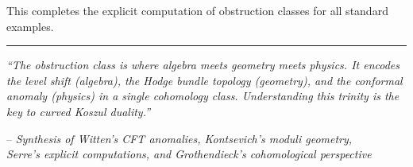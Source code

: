 This completes the explicit computation of obstruction classes for all standard examples.

\begin{center}
\rule{0.5\textwidth}{0.4pt}

\textit{``The obstruction class is where algebra meets geometry meets physics. 
It encodes the level shift (algebra), the Hodge bundle topology (geometry), and 
the conformal anomaly (physics) in a single cohomology class. Understanding this 
trinity is the key to curved Koszul duality.''}

-- \textit{Synthesis of Witten's CFT anomalies, Kontsevich's moduli geometry, \\
Serre's explicit computations, and Grothendieck's cohomological perspective}
\end{center}

